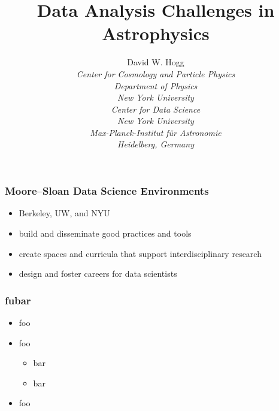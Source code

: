 \documentclass[pdftex]{beamer}
\title{Data Analysis Challenges in Astrophysics}
\author[David W. Hogg (NYU)]{David W. Hogg \\[1ex]
  \textsl{\small Center for Cosmology and Particle Physics\\
                 Department of Physics\\
                 New York University\\[2ex]
                 Center for Data Science\\
                 New York University\\[2ex]
                 Max-Planck-Institut f\"ur Astronomie\\
                 Heidelberg, Germany}}
\begin{document}
\begin{frame}
  \titlepage
\end{frame}

\begin{frame}
  \frametitle{Moore--Sloan Data Science Environments}
  \begin{itemize}
  \item Berkeley, UW, and NYU
  \item build and disseminate good practices and tools
  \item create spaces and curricula that support interdisciplinary research
  \item design and foster careers for data scientists
  \end{itemize}
\end{frame}

\begin{frame}
  \frametitle{fubar}
  \begin{itemize}
  \item foo
  \item foo
    \begin{itemize}
    \item bar
    \item bar
    \end{itemize}
  \item foo
  \end{itemize}
\end{frame}
\end{document}
